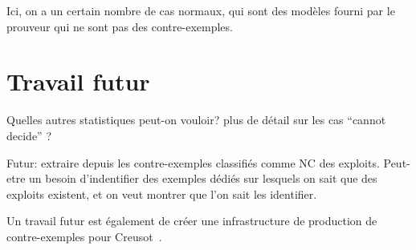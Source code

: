 \documentclass[a4paper,11pt]{article}
\begin{document}
Ici, on a un certain nombre de cas normaux, qui sont des modèles fourni par le
prouveur qui ne sont pas des contre-exemples.

\section{Travail futur}

Quelles autres statistiques peut-on vouloir? plus de détail sur les cas ``cannot decide'' ?

Futur: extraire depuis les contre-exemples classifiés comme NC des
exploits. Peut-etre un besoin d'indentifier des exemples dédiés sur lesquels on
sait que des exploits existent, et on veut montrer que l'on sait les identifier.

Un travail futur est également de créer une infrastructure de production de
contre-exemples pour Creusot~\cite{denis22icfem}.

\clearpage



%
\end{document}
